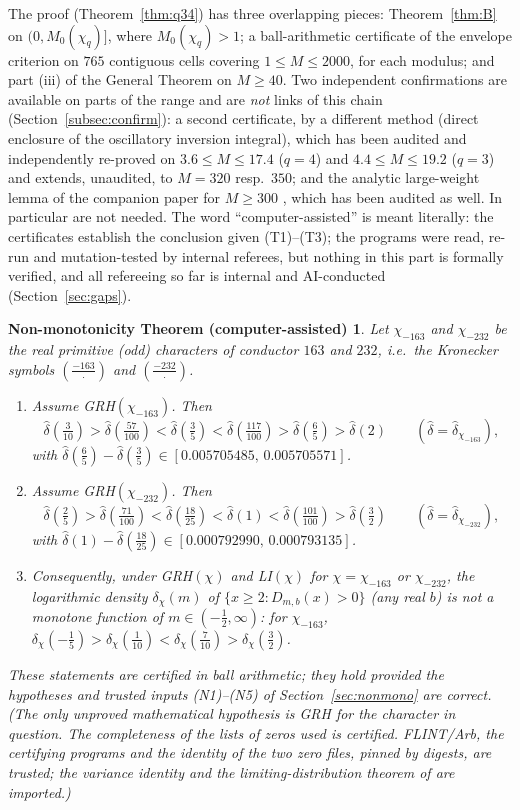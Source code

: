 \documentclass[11pt]{amsart}
\newtheorem*{nonmonothm}{Non-monotonicity Theorem (computer-assisted)}
\theoremstyle{definition}
\numberwithin{equation}{section}
\newcommand{\hd}{\widehat\delta}
\begin{document}
The proof (Theorem~\ref{thm:q34}) has three overlapping pieces:
Theorem~\ref{thm:B} on $(0,M_0(\chi_q)]$, where $M_0(\chi_q)>1$; a
ball-arithmetic certificate of the envelope criterion on $765$
contiguous cells covering $1\le M\le2000$, for each modulus; and part
(iii) of the General Theorem on $M\ge40$. Two independent
confirmations are available on parts of the range and are \emph{not}
links of this chain (Section~\ref{subsec:confirm}): a second
certificate, by a different method (direct enclosure of the
oscillatory inversion integral), which has been audited and
independently re-proved on $3.6\le M\le17.4$ ($q=4$) and
$4.4\le M\le19.2$ ($q=3$) and extends, unaudited, to $M=320$ resp.\
$350$; and the analytic large-weight lemma of the companion paper for
$M\ge300$ \cite[Lemma~24]{WR}, which has been audited as well. In
particular \cite[Theorem~4 and Corollary~7]{WR} are not needed. The
word ``computer-assisted'' is meant literally: the certificates
establish the conclusion given (T1)--(T3); the programs were read,
re-run and mutation-tested by internal referees, but nothing in this
part is formally verified, and all refereeing so far is internal and
AI-conducted (Section~\ref{sec:gaps}).

\begin{nonmonothm}
Let $\chi_{-163}$ and $\chi_{-232}$ be the real primitive (odd)
characters of conductor $163$ and $232$, i.e.\ the Kronecker symbols
$(\frac{-163}{\cdot})$ and $(\frac{-232}{\cdot})$.
\begin{enumerate}
\item[(i)] Assume GRH$(\chi_{-163})$. Then
\[
\hd(\tfrac3{10})>\hd(\tfrac{57}{100})<\hd(\tfrac35)<\hd(\tfrac{117}{100})
>\hd(\tfrac65)>\hd(2)\qquad(\hd=\hd_{\chi_{-163}}),
\]
with $\hd(\tfrac65)-\hd(\tfrac35)\in[0.005705485,\,0.005705571]$.
\item[(ii)] Assume GRH$(\chi_{-232})$. Then
\[
\hd(\tfrac25)>\hd(\tfrac{71}{100})<\hd(\tfrac{18}{25})<\hd(1)<\hd(\tfrac{101}{100})
>\hd(\tfrac32)\qquad(\hd=\hd_{\chi_{-232}}),
\]
with $\hd(1)-\hd(\tfrac{18}{25})\in[0.000792990,\,0.000793135]$.
\item[(iii)] Consequently, under GRH$(\chi)$ and LI$(\chi)$ for
$\chi=\chi_{-163}$ or $\chi_{-232}$, the logarithmic density
$\delta_\chi(m)$ of $\{x\ge2:D_{m,b}(x)>0\}$ (any real $b$) is not a
monotone function of $m\in(-\tfrac12,\infty)$: for $\chi_{-163}$,
$\delta_\chi(-\tfrac15)>\delta_\chi(\tfrac1{10})<\delta_\chi(\tfrac7{10})
>\delta_\chi(\tfrac32)$.
\end{enumerate}
These statements are certified in ball arithmetic; they hold provided
the hypotheses and trusted inputs \textup{(N1)--(N5)} of
Section~\ref{sec:nonmono} are correct. (The only unproved mathematical
hypothesis is GRH for the character in question. The completeness of
the lists of zeros used is certified. FLINT/Arb, the certifying
programs and the identity of the two zero files, pinned by digests,
are trusted; the variance identity and the limiting-distribution
theorem of \cite{WR} are imported.)
\end{nonmonothm}
\end{document}
